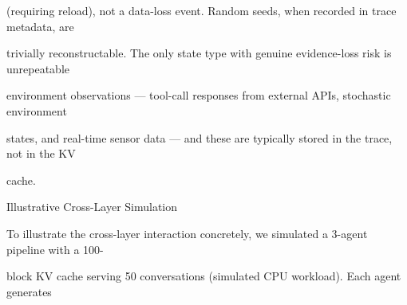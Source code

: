 \begin{flushleft}
\noindent (requiring reload), not a data-loss event. Random seeds, when recorded in trace metadata, are\par
\noindent trivially reconstructable. The only state type with genuine evidence-loss risk is unrepeatable\par
\noindent environment observations — tool-call responses from external APIs, stochastic environment\par
\noindent states, and real-time sensor data — and these are typically stored in the trace, not in the KV\par
\noindent cache.\par
\par\smallskip
{} Illustrative Cross-Layer Simulation\par
\noindent To illustrate the cross-layer interaction concretely, we simulated a 3-agent pipeline with a 100-\par
\noindent block KV cache serving 50 conversations (simulated CPU workload). Each agent generates\par
\end{flushleft}

